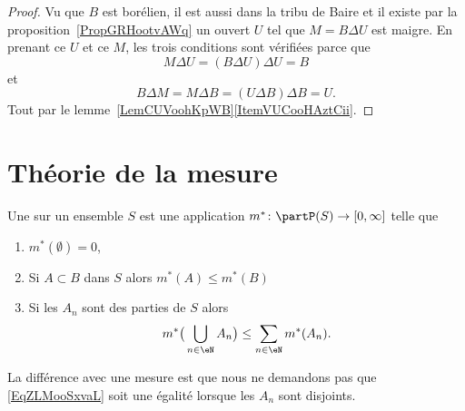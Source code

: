 \begin{proof}
    Vu que \( B\) est borélien, il est aussi dans la tribu de Baire et il existe par la proposition~\ref{PropGRHootvAWq} un ouvert \( U\) tel que \( M=B\Delta U\) est maigre. En prenant ce \( U\) et ce \( M\), les trois conditions sont vérifiées parce que
    \begin{equation}
        M\Delta U=(B\Delta U)\Delta U=B
    \end{equation}
    et
    \begin{equation}
        B\Delta M=M\Delta B=(U\Delta B)\Delta B=U.
    \end{equation}
    Tout par le lemme~\ref{LemCUVoohKpWB}\ref{ItemVUCooHAztCii}.
\end{proof}

\section{Théorie de la mesure}
\label{SecSLOooeMaig}

\begin{definition} \label{DefUMWoolmMaf}
    Une  sur un ensemble \( S\) est une application \( m^*\colon \partP(S)\to \mathopen[ 0 , \infty \mathclose]\) telle que
    \begin{enumerate}
        \item
            \( m^*(\emptyset)=0\),
        \item
            Si \( A\subset B\) dans \( S\) alors \( m^*(A)\leq m^*(B)\)
        \item   \label{ItemARKooppZfDaiii}
            Si les \( A_n\) sont des parties de \( S\) alors
            \begin{equation}    \label{EqZLMooSxvaL}
                m^*\big( \bigcup_{n\in \eN}A_n \big)\leq \sum_{n\in \eN}m^*(A_n).
            \end{equation}
    \end{enumerate}
\end{definition}
La différence avec une mesure est que nous ne demandons pas que \eqref{EqZLMooSxvaL} soit une égalité lorsque les \( A_n\) sont disjoints.

